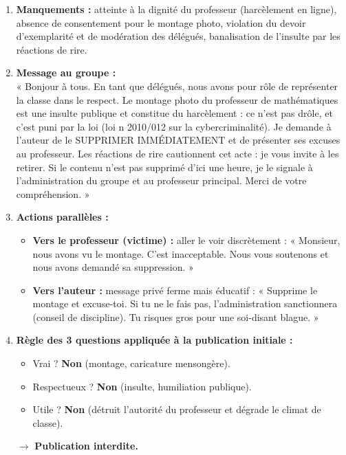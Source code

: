 \documentclass[11pt]{article}
\begin{document}
\begin{corrige}
\begin{enumerate}
    \item \textbf{Manquements :} atteinte à la dignité du professeur (harcèlement en ligne), absence de consentement pour le montage photo, violation du devoir d'exemplarité et de modération des délégués, banalisation de l'insulte par les réactions de rire.
    \item \textbf{Message au groupe :} \\
    « Bonjour à tous. En tant que délégués, nous avons pour rôle de représenter la classe dans le respect. Le montage photo du professeur de mathématiques est une insulte publique et constitue du harcèlement : ce n'est pas drôle, et c'est puni par la loi (loi n 2010/012 sur la cybercriminalité). Je demande à l'auteur de le SUPPRIMER IMMÉDIATEMENT et de présenter ses excuses au professeur. Les réactions de rire cautionnent cet acte : je vous invite à les retirer. Si le contenu n'est pas supprimé d'ici une heure, je le signale à l'administration du groupe et au professeur principal. Merci de votre compréhension. »
    \item \textbf{Actions parallèles :}
        \begin{itemize}
            \item \textbf{Vers le professeur (victime) :} aller le voir discrètement : « Monsieur, nous avons vu le montage. C'est inacceptable. Nous vous soutenons et nous avons demandé sa suppression. »
            \item \textbf{Vers l'auteur :} message privé ferme mais éducatif : « Supprime le montage et excuse-toi. Si tu ne le fais pas, l'administration sanctionnera (conseil de discipline). Tu risques gros pour une soi-disant blague. »
        \end{itemize}
    \item \textbf{Règle des 3 questions appliquée à la publication initiale :}
        \begin{itemize}
            \item Vrai ? \textbf{Non} (montage, caricature mensongère).
            \item Respectueux ? \textbf{Non} (insulte, humiliation publique).
            \item Utile ? \textbf{Non} (détruit l'autorité du professeur et dégrade le climat de classe).
        \end{itemize}
        $\rightarrow$ \textbf{Publication interdite.}
\end{enumerate}
\end{corrige}
\end{document}
